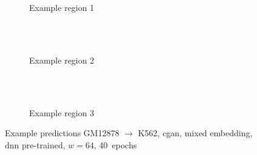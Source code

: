 \begin{figure}[p] %
    \begin{subfigure}{\textwidth}
        \centering
        \caption{Example  region 1} \label{fig:results:cGAN64_pretrained_mixed_r1}
    \end{subfigure}\\[2mm]
    \\[3mm]
    \begin{subfigure}{\textwidth}
        \centering
        \caption{Example region 2} \label{fig:results:cGAN64_pretrained_mixed_r2}
    \end{subfigure}\\[2mm]
    \\[3mm]
    \begin{subfigure}{\textwidth}
        \centering
        \caption{Example region 3} \label{fig:results:cGAN64_pretrained_mixed_r3}
    \end{subfigure}
    \caption{Example predictions GM12878 $\rightarrow$ K562, \acrshort{cgan}, mixed embedding, \acrshort{dnn} pre-trained, $w=64$, 40~epochs} 
     \label{fig:results:GAN64_pretrained_mixed_matrices}
\end{figure}

\clearpage
